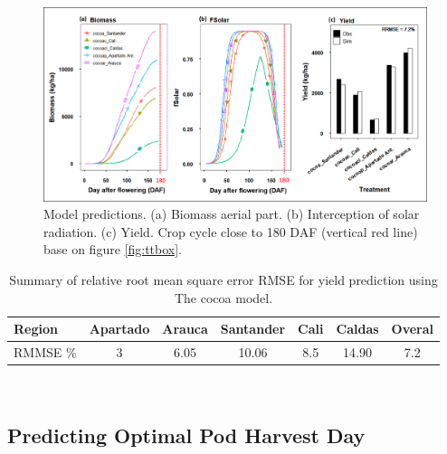 \documentclass[gene,journal,article,submit,moreauthors,pdftex]{Definitions/mdpi}
\begin{document}
\begin{figure}[h!]
	\centering
	\includegraphics[scale=0.4]{images/outmodel.png}
	\caption{\footnotesize {Model predictions. (a) Biomass aerial part. (b) Interception of solar radiation. (c) Yield. Crop cycle close to 180 DAF (vertical red line) base on figure  \ref{fig:ttbox}.  \\ }} 
	\label{fig:m1}
\end{figure}
 

\begin{table}[h!]	
	\caption {\footnotesize {Summary of relative root mean square error RMSE for yield prediction using The cocoa model.}}
	\label{tab:error} 
	\centering
	\begin{small}
		\begin{tabular}{l c c c c c c}
			\hline
			{\bf Region }&{\bf Apartado }&{\bf Arauca}&{\bf Santander}&{\bf Cali}&{\bf Caldas}&{\bf Overal}\\
			\hline
			RMMSE \%  & 3 & 6.05 & 10.06&8.5&14.90&7.2 \\
			\hline
		\end{tabular} \\
	\end{small}
\end{table}
\newpage

\subsection{Predicting Optimal Pod Harvest Day }
\end{document}
